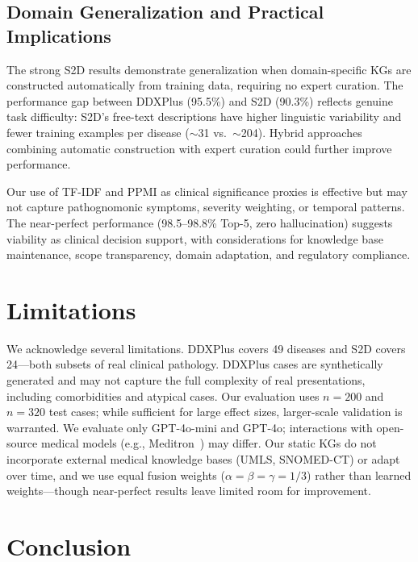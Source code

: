 \documentclass[preprint,12pt]{elsarticle}
\begin{document}
\subsection{Domain Generalization and Practical Implications}

The strong S2D results demonstrate generalization when domain-specific KGs are constructed automatically from training data, requiring no expert curation. The performance gap between DDXPlus (95.5\%) and S2D (90.3\%) reflects genuine task difficulty: S2D's free-text descriptions have higher linguistic variability and fewer training examples per disease (${\sim}$31 vs.\ ${\sim}$204). Hybrid approaches combining automatic construction with expert curation could further improve performance.

Our use of TF-IDF and PPMI as clinical significance proxies is effective but may not capture pathognomonic symptoms, severity weighting, or temporal patterns. The near-perfect performance (98.5--98.8\% Top-5, zero hallucination) suggests viability as clinical decision support, with considerations for knowledge base maintenance, scope transparency, domain adaptation, and regulatory compliance.

\section{Limitations}
\label{sec:limitations}

We acknowledge several limitations. DDXPlus covers 49 diseases and S2D covers 24---both subsets of real clinical pathology. DDXPlus cases are synthetically generated and may not capture the full complexity of real presentations, including comorbidities and atypical cases. Our evaluation uses $n{=}200$ and $n{=}320$ test cases; while sufficient for large effect sizes, larger-scale validation is warranted. We evaluate only GPT-4o-mini and GPT-4o; interactions with open-source medical models (e.g., Meditron~\cite{chen2023meditron}) may differ. Our static KGs do not incorporate external medical knowledge bases (UMLS, SNOMED-CT) or adapt over time, and we use equal fusion weights ($\alpha{=}\beta{=}\gamma{=}1/3$) rather than learned weights---though near-perfect results leave limited room for improvement.

\section{Conclusion}
\label{sec:conclusion}
\end{document}
